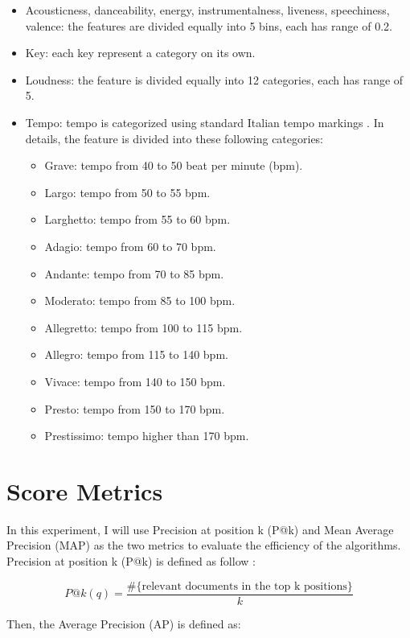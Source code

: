 \begin{itemize}
	\item Acousticness, danceability, energy, instrumentalness, liveness, speechiness, valence: the features are divided equally into 5 bins, each has range of 0.2.
	\item Key: each key represent a category on its own.
	\item Loudness: the feature is divided equally into 12 categories, each has range of 5.
	\item Tempo: tempo is categorized using standard Italian tempo markings \cite{2018Tempo}. In details, the feature is divided into these following categories:
	\begin{itemize}
		\item Grave: tempo from 40 to 50 beat per minute (bpm).
		\item Largo: tempo from 50 to 55 bpm.
		\item Larghetto: tempo from 55 to 60 bpm.
		\item Adagio: tempo from 60 to 70 bpm.
		\item Andante: tempo from 70 to 85 bpm.
		\item Moderato: tempo from 85 to 100 bpm.
		\item Allegretto: tempo from 100 to 115 bpm.
		\item Allegro: tempo from 115 to 140 bpm.
		\item Vivace: tempo from 140 to 150 bpm.
		\item Presto: tempo from 150 to 170 bpm.
		\item Prestissimo: tempo higher than 170 bpm.
\end{itemize}	  
\end{itemize}


\section{Score Metrics}
In this experiment, I will use Precision at position k (P@k) and Mean Average Precision (MAP) as the two metrics to evaluate the efficiency of the algorithms. Precision at position k (P@k) is defined as follow \cite{liu2009learning}:

\begin{displaymath}
P@k(q) = \frac{\#\text{\{relevant documents in the top k positions\}}}{k}
\end{displaymath}

Then, the Average Precision (AP) is defined as:

